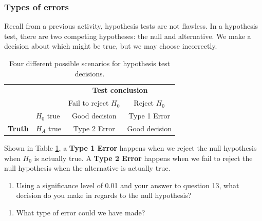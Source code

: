 \documentclass[
]{report}
\providecommand{\tightlist}{%
  \setlength{\itemsep}{0pt}\setlength{\parskip}{0pt}}
\begin{document}
\newpage

\hypertarget{types-of-errors}{%
\subsubsection*{Types of errors}\label{types-of-errors}}

Recall from a previous activity, hypothesis tests are not flawless. In a hypothesis test, there are two competing hypotheses: the null and alternative. We make a decision about which might be true, but we may choose incorrectly.

\begin{table}
\caption{Four different possible scenarios for hypothesis test decisions.}
\centering
\begin{tabular}[h]{ll|cc}
\hline
 & &  \multicolumn{2}{c}{\textbf{Test conclusion}} \\
 &  & \multicolumn{1}{c}{Fail to reject $H_0$} & \multicolumn{1}{c}{Reject $H_0$}\\
\hline
 & $H_0$ true & Good decision & Type 1 Error\\
\hline
\textbf{Truth} & $H_A$ true & Type 2 Error & Good decision\\
\hline
\end{tabular}
\label{tab:errors}
\end{table}

Shown in Table \ref{tab:errors}, a \textbf{Type 1 Error} happens when we reject the null hypothesis when \(H_0\) is actually true. A \textbf{Type 2 Error} happens when we fail to reject the null hypothesis when the alternative is actually true.

\begin{enumerate}
\def\labelenumi{\arabic{enumi}.}
\setcounter{enumi}{13}
\tightlist
\item
  Using a significance level of 0.01 and your answer to question 13, what decision do you make in regards to the null hypothesis?
\end{enumerate}

\vspace{0.3in}

\begin{enumerate}
\def\labelenumi{\arabic{enumi}.}
\setcounter{enumi}{14}
\tightlist
\item
  What type of error could we have made?
\end{enumerate}

\vspace{0.3in}
\end{document}
